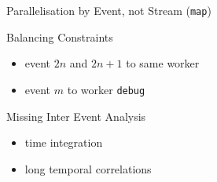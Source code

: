 \documentclass[aspectratio=169]{beamer}
\begin{document}
\begin{frame}{Parallelisation by Event, not Stream (\texttt{map})}
\begin{tikzpicture}[xscale=1.4]
 \end{tikzpicture}

 \begin{minipage}{0.49\textwidth}
\begin{block}{Balancing Constraints}
  \begin{itemize}
   \item event $2n$ and $2n+1$ to same worker
   \item event $m$ to worker \texttt{debug}
  \end{itemize}

 \end{block}
 \end{minipage}
 \begin{minipage}{0.49\textwidth}
 \begin{block}{Missing Inter Event Analysis}
  \begin{itemize}
   \item time integration
   \item long temporal correlations
  \end{itemize}

 \end{block}
  \end{minipage}

\end{frame}
\end{document}
